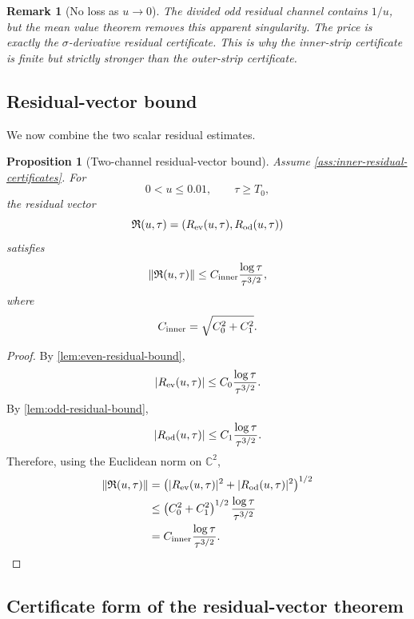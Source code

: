 \documentclass[11pt]{article}
\newtheorem{proposition}[theorem]{Proposition}
\newtheorem{remark}[theorem]{Remark}
\newcommand{\Rvec}{\mathfrak R}
\newcommand{\Cinner}{C_{\rm inner}}
\newcommand{\Czero}{C_0}
\newcommand{\Cone}{C_1}
\begin{document}
\begin{remark}[No loss as \(u\to0\)]
The divided odd residual channel contains \(1/u\), but the mean value theorem
removes this apparent singularity.  The price is exactly the
\(\sigma\)-derivative residual certificate.  This is why the inner-strip
certificate is finite but strictly stronger than the outer-strip certificate.
\end{remark}

\subsection{Residual-vector bound}

We now combine the two scalar residual estimates.

\begin{proposition}[Two-channel residual-vector bound]
\label{prop:residual-vector-bound}
Assume \cref{ass:inner-residual-certificates}.  For
\[
        0<u\le0.01,
        \qquad
        \tau\ge T_0,
\]
the residual vector
\[
        \Rvec(u,\tau)
        =
        \left(
        R_{\rm ev}(u,\tau),
        R_{\rm od}(u,\tau)
        \right)
\]
satisfies
\[
        \|\Rvec(u,\tau)\|
        \le
        \Cinner
        \frac{\log\tau}{\tau^{3/2}},
\]
where
\[
        \Cinner
        =
        \sqrt{\Czero^2+\Cone^2}.
\]
\end{proposition}

\begin{proof}
By \cref{lem:even-residual-bound},
\[
        |R_{\rm ev}(u,\tau)|
        \le
        \Czero
        \frac{\log\tau}{\tau^{3/2}}.
\]
By \cref{lem:odd-residual-bound},
\[
        |R_{\rm od}(u,\tau)|
        \le
        \Cone
        \frac{\log\tau}{\tau^{3/2}}.
\]
Therefore, using the Euclidean norm on \(\mathbb C^2\),
\[
\begin{aligned}
        \|\Rvec(u,\tau)\|
        &=
        \left(
        |R_{\rm ev}(u,\tau)|^2
        +
        |R_{\rm od}(u,\tau)|^2
        \right)^{1/2}
\\
        &\le
        \left(
        \Czero^2+\Cone^2
        \right)^{1/2}
        \frac{\log\tau}{\tau^{3/2}}
\\
        &=
        \Cinner
        \frac{\log\tau}{\tau^{3/2}}.
\end{aligned}
\]
\end{proof}

\subsection{Certificate form of the residual-vector theorem}
\end{document}
